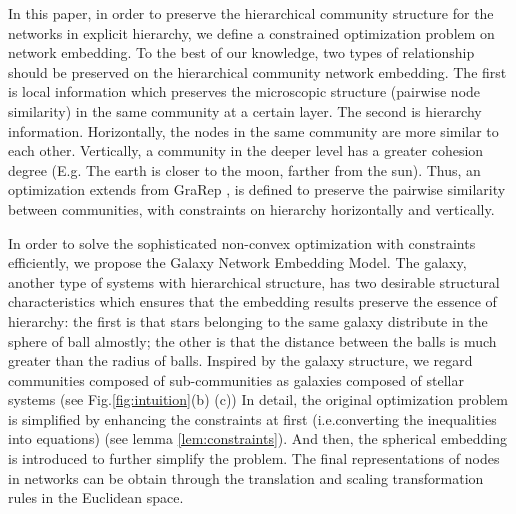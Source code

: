 \documentclass{article}
\theoremstyle{definition}
\begin{document}

		In this paper, in order to preserve the hierarchical community structure for the networks in explicit hierarchy, we define a constrained optimization problem on network embedding. To the best of our knowledge, two types of relationship should be preserved on the hierarchical community network embedding. The first is local information which preserves the microscopic structure (pairwise node similarity) in the same community at a certain layer. The second is hierarchy information. Horizontally, the nodes in the same community are more similar to each other. Vertically, a community in the deeper level has a greater cohesion degree (E.g. The earth is closer to the moon, farther from the sun). Thus, an optimization extends from GraRep \cite{Cao2015GraRep}, is defined to preserve the pairwise similarity between communities, with constraints on hierarchy horizontally and vertically. 

		In order to solve the sophisticated non-convex optimization with constraints efficiently, we propose the Galaxy Network Embedding Model. The galaxy, another type of systems with hierarchical structure, has two desirable structural characteristics which ensures that the embedding results preserve the essence of hierarchy: the first is that stars belonging to the same galaxy distribute in the sphere of ball almostly; the other is that the distance between the balls is much greater than the radius of balls. Inspired by the galaxy structure, we regard communities composed of sub-communities as galaxies composed of stellar systems (see Fig.\ref{fig:intuition}(b) (c)) 
		In detail, the original optimization problem is simplified by enhancing the constraints at first (i.e.converting the inequalities into equations) (see lemma \ref{lem:constraints}). And then, the spherical embedding is introduced to further simplify the problem. The final representations of nodes in networks can be obtain through the translation and scaling transformation rules in the Euclidean space.
		
\end{document}
